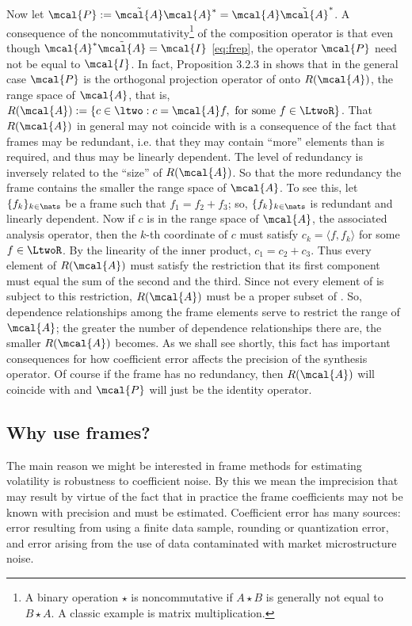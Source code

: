 \documentclass[a4paper, 12pt]{article}
\newcommand{\inner}[2]{\ensuremath{\langle{#1},{#2}\rangle}\xspace}
\newcommand{\ap}{\ensuremath{\mcal{A}}\xspace}
\begin{document}
Now let $\mcal{P}:= \tilde{\mcal{A}}\mcal{A}^*  = \mcal{A}\tilde{\mcal{A}}^*$. A consequence of the noncommutativity\footnote{A binary operation $\star$ is noncommutative if $A\star B$ is generally not equal to $B\star A$. A classic  example is matrix multiplication.}   of the composition operator is that even though $\mcal{A}^*\tilde{\mcal{A}} = \mcal{I}$  \eqref{eq:frep}, the operator $\mcal{P}$   need not be equal to $\mcal{I}$. In fact, Proposition 3.2.3 in \citep{Daubechies1992} shows that in the general case $\mcal{P}$ is the orthogonal projection operator of \ltwo onto $R(\ap)$, the range space of $\mcal{A}$, that is, {$R(\mcal{A}) := \{c \in \ltwo : c = \mcal{A} f, \text{ for some } f \in \LtwoR\}$}.   That $R(\mcal{A})$ in general may not coincide  with \ltwo is a consequence of the fact that  frames  may be redundant, i.e.  that they may contain ``more'' elements than is required, and thus may be linearly dependent. The level of redundancy is inversely related to the ``size'' of  $R(\mcal{A})$. So that the more redundancy the frame contains the smaller the range space of \ap. To see this, let $\{f_k\}_{k \in \nats}$ be a  frame  such that $f_1 = f_2 + f_3$; so, $\{f_k\}_{k \in \nats}$ is redundant and  linearly dependent. Now if $c$ is in the range space of \ap, the associated analysis operator, then  the $k$-th coordinate of $c$ must satisfy $c_k = \inner{f}{f_k}$  for some $f \in \LtwoR$.  By the linearity of the inner product, $c_1 = c_2 + c_3$. Thus every element of $R(\ap)$ must satisfy the restriction that its first component must equal the sum of the second and the third. Since not every element of  \ltwo is subject to this restriction, $R(\ap)$ must be a proper subset of \ltwo. So, dependence relationships among the frame elements serve to restrict the range of \ap; the greater the number of dependence relationships there are, the smaller $R(\ap)$ becomes.   As we shall see shortly, this fact has important consequences for how coefficient error affects the precision of the synthesis operator. Of course if the frame has no redundancy, then $R(\mcal{A})$   will coincide with \ltwo and $\mcal{P}$ will just be the identity operator. 
\subsection{Why use frames?}\label{sub:why}
The main reason we might be interested in frame methods for estimating volatility is robustness to coefficient noise. By this we mean the imprecision that may result by virtue of the fact that in practice the frame coefficients may not be known with precision and must be estimated. Coefficient error has many sources: error resulting from using a finite data sample, rounding or quantization error,  and error arising from the use of data contaminated with market microstructure noise. 
\end{document}
